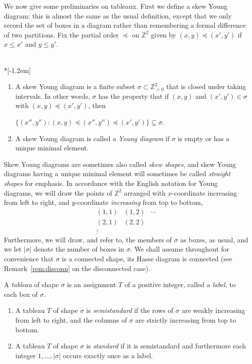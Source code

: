 \documentclass[ALCO,ThmDefs,Unicode,epreuves]{cedram}
\newcommand{\ZZ}{\mathbb{Z}}
\begin{document}
We now give some preliminaries on tableaux. First we define a skew Young diagram: this is almost the same as the usual definition, except that we only record the set of boxes in a diagram rather than remembering a formal difference of two partitions.
Fix the partial order $\preceq$ on $\ZZ^2$ given by $(x,y)\preceq (x',y')$ if $x\le x'$ and $y\le y'$. 

\begin{defi}\label{def:young}\ \\*[-1.2em]
\begin{enumerate}
\item\label{defi2.1_1} 
A skew Young diagram is a finite subset $\sigma \subset \ZZ_{>0}^2$ that is closed under taking intervals. In other words, $\sigma$ has the property that if $(x,y)$ and $(x',y')\in \sigma$ with $(x,y)\preceq (x',y')$, then 
\begin{center}
$\{(x'',y''):(x,y)\preceq (x'',y'') \preceq (x',y')\}\subseteq \sigma.$
\end{center}
\item\label{defi2.1_2} A skew Young diagram is called a \emph{Young diagram} if $\sigma$ is empty or has a unique minimal element.
\end{enumerate}
\end{defi}

Skew Young diagrams are sometimes also called \emph{skew shapes}, and skew Young diagrams having a unique minimal element will sometimes be called \emph{straight shapes} for emphasis. 
In accordance with the English notation for Young diagrams, we will draw the points of $\ZZ^2$ arranged with $x$-coordinate increasing from left to right, and $y$-coordinate \emph{increasing} from top to bottom, \eg
\[
\begin{array}{ccc}
(1,1) & (1,2) & \cdots \\
(2,1) & (2,2) & \\
\vdots & &
\end{array}
\]
Furthermore, we will draw, and refer to, the members of $\sigma$ as boxes, as usual, and we let $|\sigma|$ denote the number of boxes in $\sigma$. We shall assume throughout for convenience that $\sigma$ is a connected shape, \ie its Hasse diagram is connected (see Remark~\ref{rem:disconn} on the disconnected case). 

\begin{defi} \label{def:tableau}
A \emph{tableau} of shape $\sigma$ is an assignment $T$ of a positive integer, called a \emph{label}, to each box of $\sigma$. \begin{enumerate}
\item\label{defi2.2_1} A tableau $T$ of shape $\sigma$ is \emph{semistandard} if the rows of $\sigma$ are weakly increasing from left to right, and the columns of $\sigma$ are strictly increasing from top to bottom.
\item\label{defi2.2_2} A tableau $T$ of shape $\sigma$ is \emph{standard} if it is semistandard and furthermore each integer $1,\ldots,|\sigma|$ occurs exactly once as a label.
\end{enumerate}

\end{defi}
\end{document}
